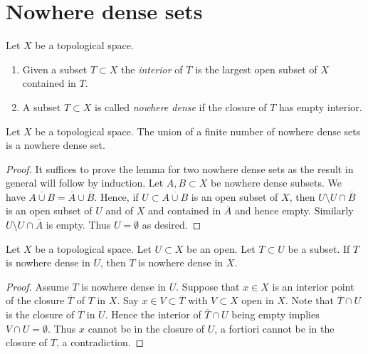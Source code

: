 \section{Nowhere dense sets}
\label{section-nowhere-dense}

\begin{definition}
\label{definition-nowhere-dense}
Let $X$ be a topological space.
\begin{enumerate}
\item Given a subset $T \subset X$ the {\it interior} of $T$ is the
largest open subset of $X$ contained in $T$.
\item A subset $T \subset X$ is called {\it nowhere dense} if the closure of
$T$ has empty interior.
\end{enumerate}
\end{definition}

\begin{lemma}
\label{lemma-nowhere-dense}
Let $X$ be a topological space. The union of a finite number of nowhere
dense sets is a nowhere dense set.
\end{lemma}

\begin{proof}
It suffices to prove the lemma for two nowhere dense sets as the result in
general will follow by induction. Let $A,B \subset X$ be nowhere dense subsets.
We have $\overline{A \cup B} = \overline{A} \cup \overline{B}$.
Hence, if $U \subset \overline{A \cup B}$ is an open subset of $X$, then
$U \setminus U \cap \overline{B}$ is an open subset of $U$ and of $X$
and contained in $\overline{A}$ and hence empty. Similarly
$U \setminus U \cap \overline{A}$ is empty. Thus $U = \emptyset$
as desired.
\end{proof}

\begin{lemma}
\label{lemma-image-nowhere-dense-open}
Let $X$ be a topological space.
Let $U \subset X$ be an open.
Let $T \subset U$ be a subset.
If $T$ is nowhere dense in $U$, then $T$ is nowhere dense in $X$.
\end{lemma}

\begin{proof}
Assume $T$ is nowhere dense in $U$.
Suppose that $x \in X$ is an interior point of the closure
$\overline{T}$ of $T$ in $X$. Say $x \in V \subset \overline{T}$
with $V \subset X$ open in $X$. Note that $\overline{T} \cap U$ is
the closure of $T$ in $U$. Hence the interior of $\overline{T} \cap U$
being empty implies $V \cap U = \emptyset$. Thus $x$ cannot be in the
closure of $U$, a fortiori cannot be in the closure of $T$, a contradiction.
\end{proof}

